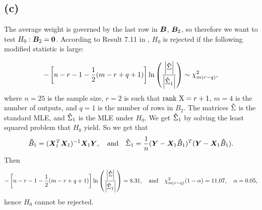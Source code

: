 \subsection*{(c)}
\label{sec:c-5}

The average weight is governed by the last row in $\bm{B}$, $\bm{B}_{2}$, so therefore we
want to test $H_{0}: \bm{B}_{2} = \bm{0}$. According to Result 7.11 in
\cite[p. 396]{book}, $H_{0}$ is rejected if the  following modified statistic is large:

\begin{equation*}
  -\left[n - r- 1 - \frac{1}{2}(m-r+q+1)\right]\ln
  \left(
    \frac{\left| \bm{\hat}\Sigma \right|}{\left| \bm{\hat}\Sigma_{1} \right|}
  \right) \sim \chi^{2}_{m(r-q)},
\end{equation*}
where $n= 25$ is the sample size, $r=2$ is such that $\text{rank X} = r + 1$,
$m=4$ is the number of outputs, and $q=1$ is the number of rows in
$B_{2}$. The matrices $\bm{\hat} \Sigma$ is the standard MLE, and
$\bm{\hat}\Sigma_{1}$ is the MLE under $H_{0}$. We get $\bm{\hat}\Sigma_{1}$
by solving the least squared problem that $H_{0}$ yield. So we get that
\begin{equation*}
  \bm{\hat} B_{1} = (\bm{X}_{1}^{T} \bm{X}_{1})^{-1}\bm{X}_{1} \bm{Y}, \quad
  \text{and} \quad 
  \bm{\hat}\Sigma_{1} = \frac{1}{n} (\bm{Y}  - \bm{X}_{1} \bm{\hat} B_{1})^{T}(\bm{Y}  - \bm{X}_{1} \bm{\hat} B_{1}).
\end{equation*}
Then
\begin{equation*}
    -\left[n - r- 1 - \frac{1}{2}(m-r+q+1)\right]\ln
  \left(
    \frac{\left| \bm{\hat}\Sigma \right|}{\left| \bm{\hat}\Sigma_{1} \right|}
  \right) =8.31, \quad \text{and}\quad \chi^{2}_{m(r-q)}(1 - \alpha) = 11.07,\quad \alpha = 0.05,
\end{equation*}
hence $H_{0}$ cannot be rejected. 

